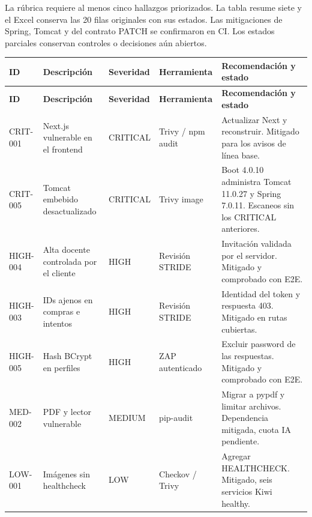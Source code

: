 \documentclass[12pt,a4paper]{article}
\begin{document}
La rúbrica requiere al menos cinco hallazgos priorizados. La tabla resume siete y el Excel conserva las 20 filas originales con sus estados. Las mitigaciones de Spring, Tomcat y del contrato PATCH se confirmaron en CI. Los estados parciales conservan controles o decisiones aún abiertos.\par
{\small\setlength{\tabcolsep}{4pt}\renewcommand{\arraystretch}{1.18}
\begin{longtable}{>{\RaggedRight\arraybackslash}p{}>{\RaggedRight\arraybackslash}p{}>{\RaggedRight\arraybackslash}p{}>{\RaggedRight\arraybackslash}p{}>{\RaggedRight\arraybackslash}p{}}
\toprule
\textbf{ID} & \textbf{Descripción} & \textbf{Severidad} & \textbf{Herramienta} & \textbf{Recomendación y estado} \\
\midrule\endfirsthead
\toprule
\textbf{ID} & \textbf{Descripción} & \textbf{Severidad} & \textbf{Herramienta} & \textbf{Recomendación y estado} \\
\midrule\endhead
\bottomrule\endfoot
CRIT-001 & Next.js vulnerable en el frontend & CRITICAL & Trivy / npm audit & Actualizar Next y reconstruir. Mitigado para los avisos de línea base. \\[3pt]
CRIT-005 & Tomcat embebido desactualizado & CRITICAL & Trivy image & Boot 4.0.10 administra Tomcat 11.0.27 y Spring 7.0.11. Escaneos sin los CRITICAL anteriores. \\[3pt]
HIGH-004 & Alta docente controlada por el cliente & HIGH & Revisión STRIDE & Invitación validada por el servidor. Mitigado y comprobado con E2E. \\[3pt]
HIGH-003 & IDs ajenos en compras e intentos & HIGH & Revisión STRIDE & Identidad del token y respuesta 403. Mitigado en rutas cubiertas. \\[3pt]
HIGH-005 & Hash BCrypt en perfiles & HIGH & ZAP autenticado & Excluir password de las respuestas. Mitigado y comprobado con E2E. \\[3pt]
MED-002 & PDF y lector vulnerable & MEDIUM & pip-audit & Migrar a pypdf y limitar archivos. Dependencia mitigada, cuota IA pendiente. \\[3pt]
LOW-001 & Imágenes sin healthcheck & LOW & Checkov / Trivy & Agregar HEALTHCHECK. Mitigado, seis servicios Kiwi healthy. \\[3pt]
\end{longtable}}
\end{document}
